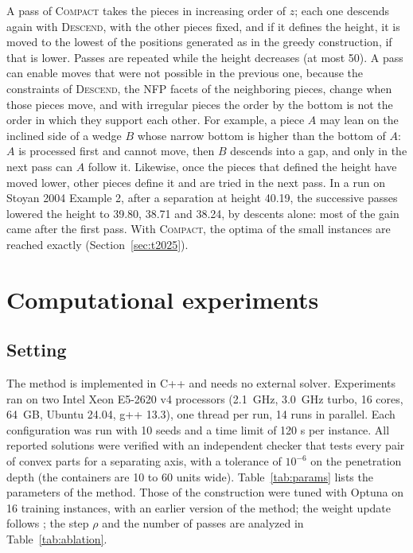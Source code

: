 \documentclass[preprint,12pt,authoryear]{elsarticle}
\begin{document}
A pass of \textsc{Compact} takes the pieces in increasing order of $z$; each one descends again with
\textsc{Descend}, with the other pieces fixed, and if it defines the height, it is moved to the lowest of the
positions generated as in the greedy construction, if that is lower. Passes are repeated while the height
decreases (at most 50). A pass can enable moves that were not possible in the previous one, because the
constraints of \textsc{Descend}, the NFP facets of the neighboring pieces, change when those pieces move, and with
irregular pieces the order by the bottom is not the order in which they support each other. For example, a piece
$A$ may lean on the inclined side of a wedge $B$ whose narrow bottom is higher than the bottom of $A$: $A$ is
processed first and cannot move, then $B$ descends into a gap, and only in the next pass can $A$ follow it.
Likewise, once the pieces that defined the height have moved lower, other pieces define it and are tried in the
next pass. In a run on Stoyan 2004 Example 2, after a separation at height 40.19, the successive passes lowered
the height to 39.80, 38.71 and 38.24, by descents alone: most of the gain came after the first pass. With
\textsc{Compact}, the optima of the small instances are reached exactly (Section~\ref{sec:t2025}).

\section{Computational experiments}\label{sec:exp}

\subsection{Setting}
The method is implemented in C++ and needs no external solver. Experiments ran on two Intel Xeon E5-2620 v4 processors (2.1~GHz, 3.0~GHz turbo, 16 cores, 64~GB, Ubuntu 24.04,
g++ 13.3), one thread per run, 14 runs in parallel. Each configuration was run with 10 seeds and a time limit of 120 s per
instance. All reported solutions were verified with an independent checker that tests every pair of convex parts
for a separating axis, with a tolerance of $10^{-6}$ on the penetration depth (the containers are 10 to 60 units
wide). Table~\ref{tab:params} lists the parameters of the method. Those of the construction were
tuned with Optuna \citep{akiba2019} on 16 training instances, with an earlier version of the method; the weight update follows
\citet{gardeyn2025}; the step $\rho$ and the number of passes are analyzed in Table~\ref{tab:ablation}.
\end{document}
